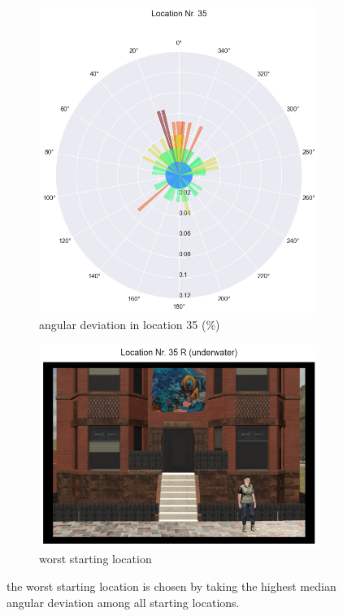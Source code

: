 \begin{figure}[!h]
	\begin{subfigure}[b]{0.48\linewidth}
		\includegraphics[width=\linewidth]{figures/deviation_degrees_loc_nr_35_23.png}
		\caption{angular deviation in location 35 (\%)}
		\label{fig:best_angular_dist_35}
	\end{subfigure}
	\begin{subfigure}[b]{0.48\linewidth}
		\includegraphics[width=\linewidth]{figures/worst_loc_angular_error__withHA_23.png}
		\caption{worst starting location}
		\label{fig:worst_angular}
	\end{subfigure}

	\caption[Worst starting location based on angular deviation]{the worst starting location is chosen by taking the highest median angular deviation among all starting locations.}
\end{figure}
\label{fig:worst_location}

